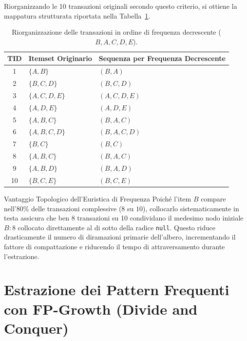 Riorganizzando le 10 transazioni originali secondo questo criterio, si ottiene la mappatura strutturata riportata nella Tabella~\ref{tab:dm-fp-reordered-transactions}.

\begin{table}[H]
\centering
\caption{Riorganizzazione delle transazioni in ordine di frequenza decrescente ($B, A, C, D, E$).}
\label{tab:dm-fp-reordered-transactions}
\begin{tabular}{c l l}
\toprule
\textbf{TID} & \textbf{Itemset Originario} & \textbf{Sequenza per Frequenza Decrescente} \\
\midrule
1  & $\{A, B\}$          & $(B, A)$ \\
2  & $\{B, C, D\}$       & $(B, C, D)$ \\
3  & $\{A, C, D, E\}$    & $(A, C, D, E)$ \\
4  & $\{A, D, E\}$       & $(A, D, E)$ \\
5  & $\{A, B, C\}$       & $(B, A, C)$ \\
6  & $\{A, B, C, D\}$    & $(B, A, C, D)$ \\
7  & $\{B, C\}$          & $(B, C)$ \\
8  & $\{A, B, C\}$       & $(B, A, C)$ \\
9  & $\{A, B, D\}$       & $(B, A, D)$ \\
10 & $\{B, C, E\}$       & $(B, C, E)$ \\
\bottomrule
\end{tabular}
\end{table}

\begin{noteblock}{Vantaggio Topologico dell'Euristica di Frequenza}
    Poiché l'item $B$ compare nell'80\% delle transazioni complessive ($8$ su $10$), collocarlo sistematicamente in testa assicura che ben 8 transazioni su 10 condividano il medesimo nodo iniziale $B:8$ collocato direttamente al di sotto della radice \texttt{null}. Questo riduce drasticamente il numero di diramazioni primarie dell'albero, incrementando il fattore di compattazione e riducendo il tempo di attraversamento durante l'estrazione.
\end{noteblock}

\FloatBarrier
\section{Estrazione dei Pattern Frequenti con FP-Growth (Divide and Conquer)}
\label{sec:dm-fp-growth-algorithm}

